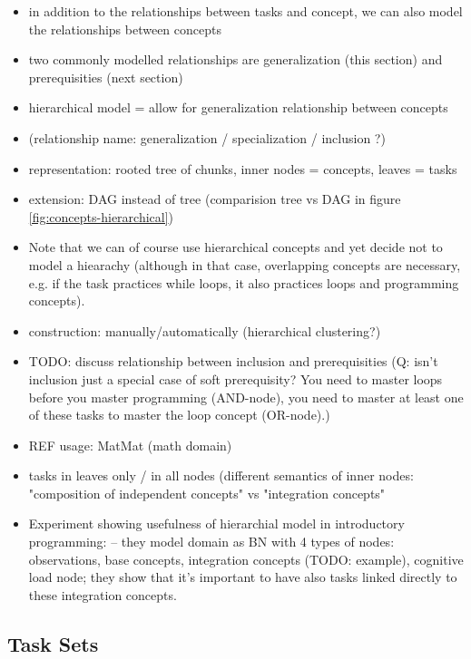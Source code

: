 \begin{itemize}
\item in addition to the relationships between tasks and concept,
  we can also model the relationships between concepts
\item two commonly modelled relationships are generalization (this section) and
  prerequisities (next section)
\item hierarchical model = allow for generalization relationship between concepts
\item (relationship name: generalization / specialization / inclusion ?)
\item representation: rooted tree of chunks, inner nodes = concepts, leaves = tasks
\item extension: DAG instead of tree
  (comparision tree vs DAG in figure \ref{fig:concepts-hierarchical})
\item Note that we can of course use hierarchical concepts and yet decide not to
  model a hiearachy (although in that case, overlapping concepts are necessary,
  e.g. if the task practices while loops, it also practices loops and programming concepts).
\item construction: manually/automatically (hierarchical clustering?)
\item TODO: discuss relationship between inclusion and prerequisities
  (Q: isn't inclusion just a special case of soft prerequisity?
  You need to master loops before you master programming (AND-node),
  you need to master at least one of these tasks to master the loop concept (OR-node).)
\item REF usage: MatMat (math domain)
\item tasks in leaves only / in all nodes (different semantics of inner nodes:
  "composition of independent concepts" vs "integration concepts"
\item Experiment showing usefulness of hierarchial model in introductory programming:
  \cite{learner-models-integration-skills} -- they model domain as BN with 4
    types of nodes: observations, base concepts, integration concepts (TODO:
    example), cognitive load node; they show that it's important to have also
    tasks linked directly to these integration concepts.
\end{itemize}


\subsection{Task Sets}

